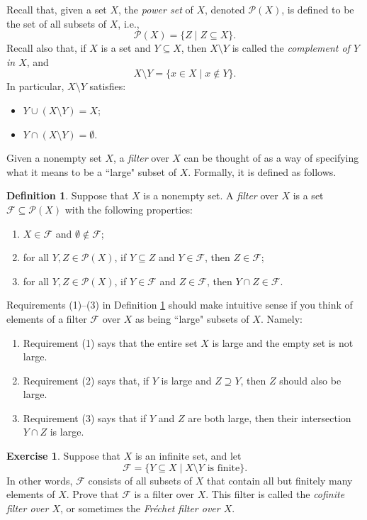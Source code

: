 \documentclass[a4paper]{memoir}
\theoremstyle{definition}
\newtheorem{definition}[theorem]{Definition}
\newtheorem{exercise}[theorem]{Exercise}
\newcommand{\power}{\ensuremath{\mathscr{P}}}
\begin{document}
Recall that, given a set $X$, the \emph{power set} of $X$, denoted $\power(X)$, is defined to be 
the set of all subsets of $X$, i.e.,
\[
  \power(X) = \{Z \mid Z \subseteq X\}.
\]
Recall also that, if $X$ is a set and $Y \subseteq X$, then $X \setminus Y$ is called the 
\emph{complement of $Y$ in $X$}, and 
\[
  X \setminus Y = \{x \in X \mid x \notin Y\}.
\]
In particular, $X \setminus Y$ satisfies:
\begin{itemize}
  \item $Y \cup (X \setminus Y) = X$;
  \item $Y \cap (X \setminus Y) = \emptyset$.
\end{itemize}
Given a nonempty set $X$, a \emph{filter} over $X$ can be thought of as a way of specifying 
what it means to be a ``large" subset of $X$. Formally, it is defined as follows.

\begin{definition} \label{def: filter}
  Suppose that $X$ is a nonempty set. A \emph{filter} over $X$ is a set 
  $\mathcal{F} \subseteq \power(X)$ with the following properties:
  \begin{enumerate}
    \item $X \in \mathcal{F}$ and $\emptyset \notin \mathcal{F}$;
    \item for all $Y,Z \in \power(X)$, if $Y \subseteq Z$ and $Y \in \mathcal{F}$, 
    then $Z \in \mathcal{F}$;
    \item for all $Y,Z \in \power(X)$, if $Y \in \mathcal{F}$ and $Z \in \mathcal{F}$, 
    then $Y \cap Z \in \mathcal{F}$.
  \end{enumerate}
\end{definition}

Requirements (1)--(3) in Definition \ref{def: filter} should make intuitive sense if you think 
of elements of a filter $\mathcal{F}$ over $X$ as being ``large" subsets of $X$. Namely:
\begin{enumerate}
  \item Requirement (1) says that the entire set $X$ is large and the empty set is not large.
  \item Requirement (2) says that, if $Y$ is large and $Z \supseteq Y$, then $Z$ should also 
  be large.
  \item Requirement (3) says that if $Y$ and $Z$ are both large, then their intersection 
  $Y \cap Z$ is large.
\end{enumerate}

\begin{exercise} \label{exercise: cofinite_filter}
  Suppose that $X$ is an infinite set, and let 
  \[
    \mathcal{F} = \{Y \subseteq X \mid X \setminus Y \text{ is finite}\}.
  \]
  In other words, $\mathcal{F}$ consists of all subsets of $X$ that contain all but finitely 
  many elements of $X$. Prove that $\mathcal{F}$ is a filter over $X$. This filter is 
  called the \emph{cofinite filter over $X$}, or sometimes the \emph{Fr\'{e}chet filter 
  over $X$}.
\end{exercise}
\end{document}
